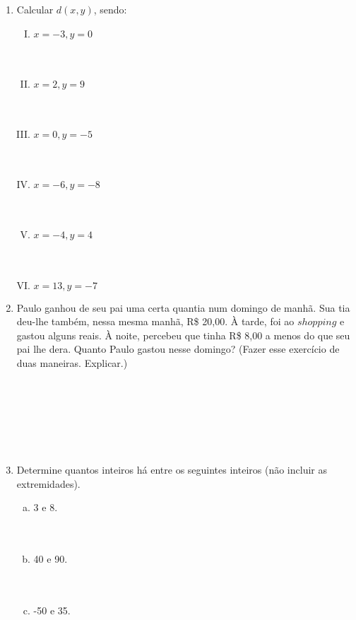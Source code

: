 \documentclass[a4paper,14pt]{article}
\begin{document}
\begin{multicols}{2}
\begin{enumerate}
    			\item Calcular $d(x, y)$, sendo:
    			\begin{enumerate}[I.]
    				\item $x = -3, y = 0$ \\\\\\
    				\item $x = 2, y = 9$ \\\\\\
    				\item $x = 0, y = -5$ \\\\\\
    				\item $x = -6, y = -8$ \\\\\\
    				\item $x = -4, y = 4$ \\\\\\
    				\item $x = 13, y = -7$ \newpage
    			\end{enumerate}
    			\item Paulo ganhou de seu pai uma certa quantia num domingo de manhã. Sua tia deu-lhe também, nessa mesma manhã, R\$ 20,00. À tarde, foi ao $shopping$ e gastou alguns reais. À noite, percebeu que tinha R\$ 8,00 a menos do que seu pai lhe dera. Quanto Paulo gastou nesse domingo? (Fazer esse exercício de duas maneiras. Explicar.) \\\\\\\\\\\\\\
    			\item Determine quantos inteiros há entre os seguintes inteiros (não incluir as extremidades).
    			\begin{enumerate}[a)]
    				\item 3 e 8. \\\\\\
    				\item 40 e 90. \\\\\\
    				\item -50 e 35. \\\\\\

\end{enumerate}
\end{enumerate}
\end{multicols}
\end{document}
